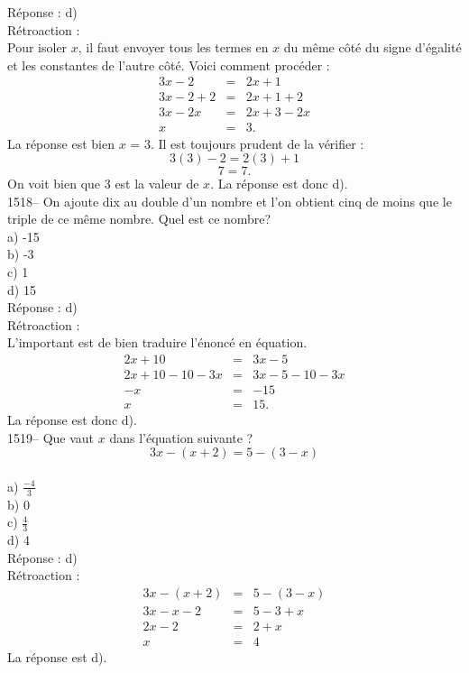 R\'eponse : d)\\

R\'etroaction :\\
Pour isoler $x$, il faut envoyer tous les termes en $x$ du m\^eme
c\^ot\'e du signe d'\'egalit\'e et les constantes de l'autre
c\^ot\'e. Voici comment proc\'eder :
\begin{eqnarray*}
3x-2&=&2x+1 \\ 3x-2+2&=&2x+1+2 \\ 3x-2x&=&2x+3-2x \\ x&=&3.
\end{eqnarray*}
La r\'eponse est bien $x$ = 3. Il est toujours prudent de la
v\'erifier :
$$3(3)-2=2(3)+1$$ $$7=7.$$ On voit bien que 3 est la valeur de $x$. La
r\'eponse est donc d).\\

1518-- On ajoute dix au double d'un nombre et l'on obtient cinq de
moins que le triple de ce m\^eme nombre. Quel est ce nombre?\\
a) -15\\
b) -3\\
c) 1\\
d) 15\\

R\'eponse : d)\\

R\'etroaction :\\
L'important est de bien traduire l'\'enonc\'e en \'equation.
\begin{eqnarray*}
2x+10&=&3x-5 \\ 2x+10-10-3x&=&3x-5-10-3x \\ -x &=& -15 \\ x&=&15.
\end{eqnarray*}
La r\'eponse est donc d).\\

1519-- Que vaut $x$ dans l'\'equation suivante ? $$3x-(x+2)=5-(3-x)$$ \\
a) $\frac{-4}{3}$\\[3mm]
b) 0\\[3mm]
c) $\frac{4}{3}$\\[3mm]
d) 4\\

R\'eponse : d)\\

R\'etroaction :\\
\begin{eqnarray*}
3x-(x+2)&=&5-(3-x)  \\  3x-x-2 &=& 5-3+x \\ 2x-2&=&2+x \\ x&=&4
\end{eqnarray*}
La r\'eponse est d).\\

